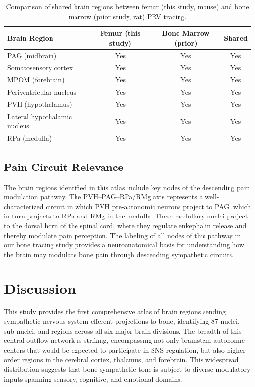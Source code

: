 \documentclass[12pt]{article}
\begin{document}
\begin{table}[ht]
\centering
\caption{Comparison of shared brain regions between femur (this study, mouse) and bone marrow (prior study, rat) PRV tracing.}
\label{tab:comparison}
\begin{tabular}{lccc}
\toprule
\textbf{Brain Region} & \textbf{Femur (this study)} & \textbf{Bone Marrow (prior)} & \textbf{Shared} \\
\midrule
PAG (midbrain) & Yes & Yes & Yes \\
Somatosensory cortex & Yes & Yes & Yes \\
MPOM (forebrain) & Yes & Yes & Yes \\
Periventricular nucleus & Yes & Yes & Yes \\
PVH (hypothalamus) & Yes & Yes & Yes \\
Lateral hypothalamic nucleus & Yes & Yes & Yes \\
RPa (medulla) & Yes & Yes & Yes \\
\bottomrule
\end{tabular}
\end{table}

\subsection{Pain Circuit Relevance}

The brain regions identified in this atlas include key nodes of the descending pain modulation pathway. The PVH--PAG--RPa/RMg axis represents a well-characterized circuit in which PVH pre-autonomic neurons project to PAG, which in turn projects to RPa and RMg in the medulla. These medullary nuclei project to the dorsal horn of the spinal cord, where they regulate enkephalin release and thereby modulate pain perception. The labeling of all nodes of this pathway in our bone tracing study provides a neuroanatomical basis for understanding how the brain may modulate bone pain through descending sympathetic circuits.

\section{Discussion}

This study provides the first comprehensive atlas of brain regions sending sympathetic nervous system efferent projections to bone, identifying 87 nuclei, sub-nuclei, and regions across all six major brain divisions. The breadth of this central outflow network is striking, encompassing not only brainstem autonomic centers that would be expected to participate in SNS regulation, but also higher-order regions in the cerebral cortex, thalamus, and forebrain. This widespread distribution suggests that bone sympathetic tone is subject to diverse modulatory inputs spanning sensory, cognitive, and emotional domains.
\end{document}

